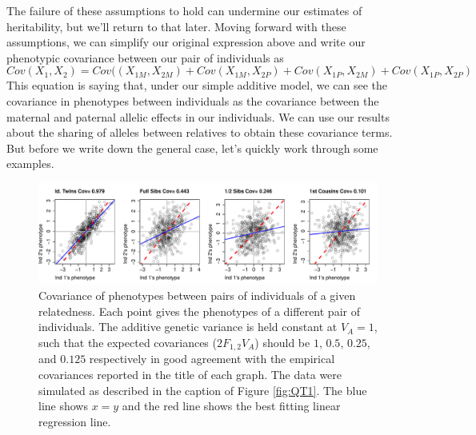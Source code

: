The failure of these assumptions
to hold can undermine our estimates of heritability, but we'll
return to that later. Moving forward with these assumptions, we can
simplify our original expression above and write our phenotypic covariance between our pair of individuals as
\begin{equation}
Cov(X_1,X_2) =
Cov((X_{1M},X_{2M})+Cov(X_{1M},X_{2P})+Cov(X_{1P},X_{2M})
+Cov(X_{1P},X_{2P}) \label{cov_rels_1}
\end{equation}
This equation is saying that, under our simple additive model, we can see the
covariance in phenotypes between individuals as the covariance between
the maternal and paternal allelic effects in our individuals. We can use our results about
the sharing of alleles between relatives to obtain these covariance terms.
But before we write down the general case, let's quickly work through some
examples. \\

 \begin{figure}
 \begin{center}
 \includegraphics[width=\textwidth]{figures/Varying_rellys_phenos.pdf}
 \end{center}
 \caption{Covariance of phenotypes between pairs of individuals of a
   given relatedness. Each point gives the phenotypes of a different
   pair of individuals. The additive genetic variance is held constant
   at $V_A=1$, such that the expected covariances ($2F_{1,2}V_A$)
   should be $1$, $0.5$, $0.25$, and $0.125$ respectively in good agreement with
   the empirical covariances reported in the title of each graph. The
   data were simulated as described in
 the caption of Figure \ref{fig:QT1}. The blue line shows $x=y$ and the red
line shows the best fitting linear regression line. }\label{fig:Varying_rellys_phenos}
 \end{figure}
 
